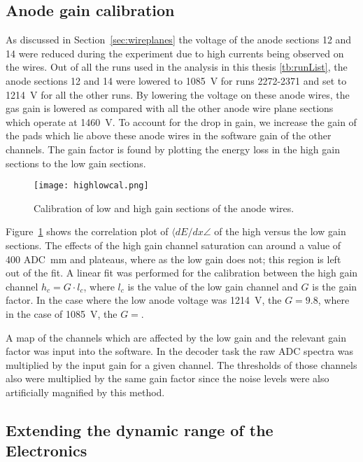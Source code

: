 \subsection{Anode gain calibration}
\label{sec:anodeCalib}
As discussed in Section~\ref{sec:wireplanes} the voltage of the anode sections 12 and 14 were reduced during the experiment due to high currents being observed on the wires. Out of all the runs used in the analysis in this thesis \ref{tb:runList}, the anode sections 12 and 14 were lowered to \SI{1085}{\volt} for runs 2272-2371 and set to \SI{1214}{\volt} for all the other runs. By lowering the voltage on these anode wires, the gas gain is lowered as compared with all the other anode wire plane sections which operate at \SI{1460}{\volt}. To account for the drop in gain, we increase the gain of the pads which lie above these anode wires  in the software gain of the other channels. The gain factor is found by plotting the energy loss in the high gain sections to the low gain sections.


\begin{figure}[!htb]
\texttt{[image: highlowcal.png]}
\caption{Calibration of low and high gain sections of the anode wires.}
\label{fig:highlowcal}
\end{figure}

Figure~\ref{fig:highlowcal} shows the correlation plot of $\langle dE/dx\angle$ of the high versus the low gain sections. The effects of the high gain channel saturation can around a value of 400 ADC\si{\per\milli\metre} and plateaus, where as the low gain does not; this region is left out of the fit. A linear fit was performed for the calibration between the high gain channel $h_c = G\cdot l_c$, where $l_c$ is the value of the low gain channel and $G$ is the gain factor. In the case where the low anode voltage was \SI{1214}{\volt}, the $G=9.8$, where in the case of \SI{1085}{\volt}, the $G = $.  

 A map of the channels which are affected by the low gain and the relevant gain factor was input into the software. In the decoder task the raw ADC spectra was multiplied by the input gain for a given channel. The thresholds of those channels also were multiplied by the same gain factor since the noise levels were also artificially magnified by this method. 

\subsection{Extending the dynamic range of the Electronics}
\label{sec:extendDynamicRange}

